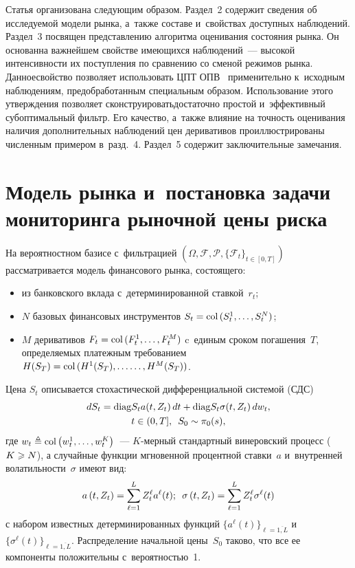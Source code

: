\begin{multicols}{2}
Статья организована следующим образом. Раздел~2 
содержит сведения об ис\-сле\-ду\-емой модели рынка, а~также составе и~свойствах 
доступных наблюдений. Раздел~3 посвящен представлению алгоритма оценивания 
состояния рынка. Он основан\linebreak на важнейшем свойстве име\-ющих\-ся наблюдений~--- 
высокой интенсивности их поступления по сравнению со сменой режимов рынка. 
Данное\linebreak свойство позволяет использовать ЦПТ ОПВ~\cite{Smith_55} применительно 
к~исходным наблюдениям, пред\-об\-ра\-бо\-тан\-ным специальным образом. Использование этого 
утверждения позволяет сконструировать\linebreak достаточно прос\-той и~эффективный 
субоптимальный фильтр. Его качество, а~также влияние на точ\-ность оценивания 
наличия дополнительных наблюдений цен деривативов проиллюстрированы численным 
примером в~разд.~4. Раздел~5 содержит заключительные замечания.



\section{Модель рынка и~постановка задачи мониторинга рыночной цены риска}

На вероятностном базисе с~фильтрацией $(\Omega, \mathcal{F}, \mathcal{P}, \{\mathcal{F}_t\}_{t \in 
[0,T]})$ рассматривается модель финансового рынка, со\-сто\-ящего:
\begin{itemize}
\item
из банковского вклада с~детерминированной ставкой~$r_t$;
\item
$N$ базовых финансовых инструментов $S_t \hm= \mathrm{col}\,(S_t^1,\ldots,S_t^N)$;
\item
$M$ деривативов $F_t \hm= \mathrm{col}\,(F_t^1,\ldots,F_t^M)$ c~единым сроком погашения~$T$, 
опре\-де\-ля\-емых платежным требованием $H(S_T) \hm= \mathrm{col}\,(H^1(S_T),\ldots\linebreak \ldots,H^M(S_T))$.
\end{itemize}

Цена $S_t $  описывается стохастической дифференциальной системой (СДС)
  \begin{multline}
  dS_t = \mathrm{diag} S_t a(t,Z_t)\,dt + \mathrm{diag} S_t \sigma(t,Z_t)\,dw_t,\\
   t \in (0,T],  \enskip S_0 \sim \pi_0(s),
  \label{eq:S_sys_P}
  \end{multline}
  где $w_t \triangleq \mathrm{col}\left( w_t^1,\ldots,w_t^K\right)$~--- $K$-мер\-ный стандартный винеровский 
процесс ($K \hm\geqslant N$), а
  случайные функции мгновенной процентной ставки~$a$ и~внут\-рен\-ней волатильности~$\sigma$  имеют вид:
  $$
  a\left(t,Z_t\right) = \sum\limits_{\ell=1}^L Z_t^{\ell} a^{\ell}(t);\enskip \sigma\left(t,Z_t\right) = \sum\limits_{\ell=1}^L Z_t^{\ell}  \sigma^{\ell}(t)
  $$
с набором известных детерминированных функций 
$\{a^{\ell}(t)\}_{\ell=\overline{1,L}}$  и~$\{\sigma^{\ell}(t)\}_{\ell=\overline{1,L}}$. Распределение начальной цены~$S_0$ 
таково, что все ее компоненты положительны с~ве\-ро\-ят\-ностью~1.


\end{multicols}
